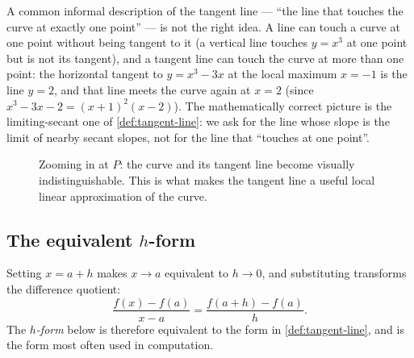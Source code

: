 \begin{caution}
A common informal description of the tangent line --- ``the line that touches the curve at exactly one point'' --- is not the right idea. A line can touch a curve at one point without being tangent to it (a vertical line touches \(y = x^{3}\) at one point but is not its tangent), and a tangent line can touch the curve at more than one point: the horizontal tangent to \(y = x^{3} - 3x\) at the local maximum \(x = -1\) is the line \(y = 2\), and that line meets the curve again at \(x = 2\) (since \(x^{3} - 3x - 2 = (x + 1)^{2}(x - 2)\)). The mathematically correct picture is the limiting-secant one of \cref{def:tangent-line}: we ask for the line whose slope is the limit of nearby secant slopes, not for the line that ``touches at one point''.
\end{caution}

\begin{figure}[H]
\centering
{}
\caption{Zooming in at \(P\): the curve and its tangent line become visually indistinguishable. This is what makes the tangent line a useful local linear approximation of the curve.}
\label{fig:tangent-zoom}
\end{figure}

\subsection{The equivalent \texorpdfstring{$h$}{h}-form}

Setting \(x = a + h\) makes \(x \to a\) equivalent to \(h \to 0\), and substituting transforms the difference quotient:
\[
\frac{f(x) - f(a)}{x - a} = \frac{f(a + h) - f(a)}{h}.
\]
The \emph{\(h\)-form} below is therefore equivalent to the form in \cref{def:tangent-line}, and is the form most often used in computation.

